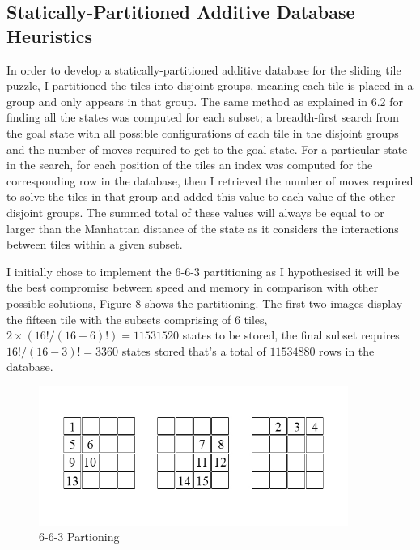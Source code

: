 \documentclass[progress]{cmpreport}
\begin{document}
\subsection{Statically-Partitioned Additive Database Heuristics}
In order to develop a statically-partitioned additive database for the sliding tile puzzle, I partitioned the tiles into disjoint groups, meaning each tile is placed in a group and only appears in that group. The same method as explained in 6.2 for finding all the states was computed for each subset; a breadth-first search from the goal state with all possible configurations of each tile in the disjoint groups and the number of moves required to get to the goal state. For a particular state in the search, for each position of the tiles an index was computed for the corresponding row in the database, then I retrieved the number of moves required to solve the tiles in that group and added this value to each value of the other disjoint groups. The summed total of these values will always be equal to or larger than the Manhattan distance of the state as it considers the interactions between tiles within a given subset.	

I initially chose to implement the 6-6-3 partitioning as I hypothesised it will be the best compromise between speed and memory in comparison with other possible solutions, Figure 8 shows the partitioning. The first two images display the fifteen tile with the subsets comprising of 6 tiles, $2\times(16!/(16-6)!)= 11531520$ states to be stored, the final subset requires $16!/(16-3)!=3360$ states stored that's a total of $11534880$ rows in the database. 


\begin{figure}[ht]
	\centering
	\includegraphics[width=0.9\textwidth]{15tile}
	\captionsetup{justification=centering}
	\caption{6-6-3 Partioning}
\end{figure}
\end{document}
